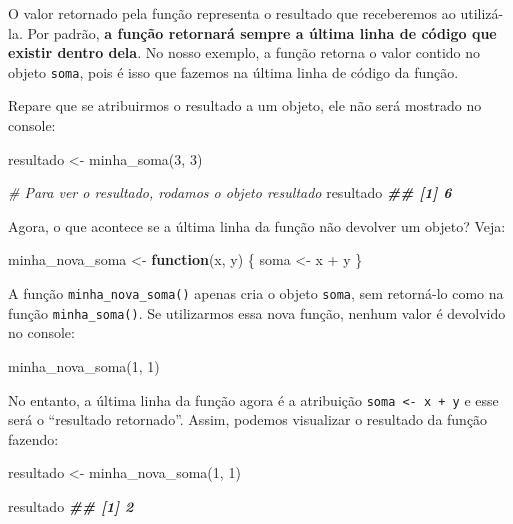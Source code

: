 \documentclass[
]{book}
\newenvironment{Shaded}{\begin{snugshade}}{\end{snugshade}}
\newcommand{\CommentTok}[1]{\textcolor[rgb]{0.56,0.35,0.01}{\textit{#1}}}
\newcommand{\ControlFlowTok}[1]{\textcolor[rgb]{0.13,0.29,0.53}{\textbf{#1}}}
\newcommand{\DecValTok}[1]{\textcolor[rgb]{0.00,0.00,0.81}{#1}}
\newcommand{\DocumentationTok}[1]{\textcolor[rgb]{0.56,0.35,0.01}{\textbf{\textit{#1}}}}
\newcommand{\FunctionTok}[1]{\textcolor[rgb]{0.00,0.00,0.00}{#1}}
\newcommand{\NormalTok}[1]{#1}
\newcommand{\OtherTok}[1]{\textcolor[rgb]{0.56,0.35,0.01}{#1}}
\newcommand{\SpecialCharTok}[1]{\textcolor[rgb]{0.00,0.00,0.00}{#1}}
\begin{document}
O valor retornado pela função representa o resultado que receberemos ao utilizá-la. Por padrão, \textbf{a função retornará sempre a última linha de código que existir dentro dela}. No nosso exemplo, a função retorna o valor contido no objeto \texttt{soma}, pois é isso que fazemos na última linha de código da função.

Repare que se atribuirmos o resultado a um objeto, ele não será mostrado no console:

\begin{Shaded}
\begin{Highlighting}[]
\NormalTok{resultado }\OtherTok{\textless{}{-}} \FunctionTok{minha\_soma}\NormalTok{(}\DecValTok{3}\NormalTok{, }\DecValTok{3}\NormalTok{)}

\CommentTok{\# Para ver o resultado, rodamos o objeto \textasciigrave{}resultado\textasciigrave{}}
\NormalTok{resultado}
\DocumentationTok{\#\# [1] 6}
\end{Highlighting}
\end{Shaded}

Agora, o que acontece se a última linha da função não devolver um objeto? Veja:

\begin{Shaded}
\begin{Highlighting}[]
\NormalTok{minha\_nova\_soma }\OtherTok{\textless{}{-}} \ControlFlowTok{function}\NormalTok{(x, y) \{}
\NormalTok{  soma }\OtherTok{\textless{}{-}}\NormalTok{ x }\SpecialCharTok{+}\NormalTok{ y}
\NormalTok{\}}
\end{Highlighting}
\end{Shaded}

A função \texttt{minha\_nova\_soma()} apenas cria o objeto \texttt{soma}, sem retorná-lo como na função \texttt{minha\_soma()}. Se utilizarmos essa nova função, nenhum valor é devolvido no console:

\begin{Shaded}
\begin{Highlighting}[]
\FunctionTok{minha\_nova\_soma}\NormalTok{(}\DecValTok{1}\NormalTok{, }\DecValTok{1}\NormalTok{)}
\end{Highlighting}
\end{Shaded}

No entanto, a última linha da função agora é a atribuição \texttt{soma\ \textless{}-\ x\ +\ y} e esse será o ``resultado retornado''. Assim, podemos visualizar o resultado da função fazendo:

\begin{Shaded}
\begin{Highlighting}[]
\NormalTok{resultado }\OtherTok{\textless{}{-}} \FunctionTok{minha\_nova\_soma}\NormalTok{(}\DecValTok{1}\NormalTok{, }\DecValTok{1}\NormalTok{)}

\NormalTok{resultado}
\DocumentationTok{\#\# [1] 2}
\end{Highlighting}
\end{Shaded}
\end{document}
